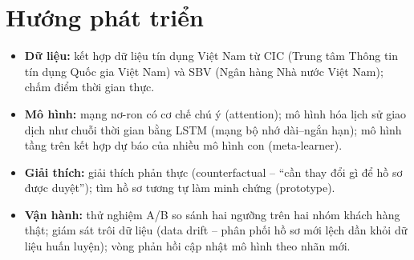 \documentclass[12pt,a4paper,oneside]{report}
\theoremstyle{vnplain}
\theoremstyle{vndef}
\begin{document}
\section{Hướng phát triển}
\begin{itemize}
  \item \textbf{Dữ liệu:} kết hợp dữ liệu tín dụng Việt Nam từ CIC (Trung tâm Thông tin tín dụng Quốc gia Việt Nam)
        và SBV (Ngân hàng Nhà nước Việt Nam); chấm điểm thời gian thực.
  \item \textbf{Mô hình:} mạng nơ-ron có cơ chế chú ý (attention); mô hình hóa lịch sử
        giao dịch như chuỗi thời gian bằng LSTM (mạng bộ nhớ dài--ngắn hạn); mô hình tầng trên kết hợp dự báo của nhiều
        mô hình con (meta-learner).
  \item \textbf{Giải thích:} giải thích phản thực (counterfactual -- ``cần thay đổi gì để
        hồ sơ được duyệt''); tìm hồ sơ tương tự làm minh chứng (prototype).
  \item \textbf{Vận hành:} thử nghiệm A/B so sánh hai ngưỡng trên hai nhóm khách hàng
        thật; giám sát trôi dữ liệu (data drift -- phân phối hồ sơ mới lệch dần khỏi dữ
        liệu huấn luyện); vòng phản hồi cập nhật mô hình theo nhãn mới.
\end{itemize}
\end{document}
